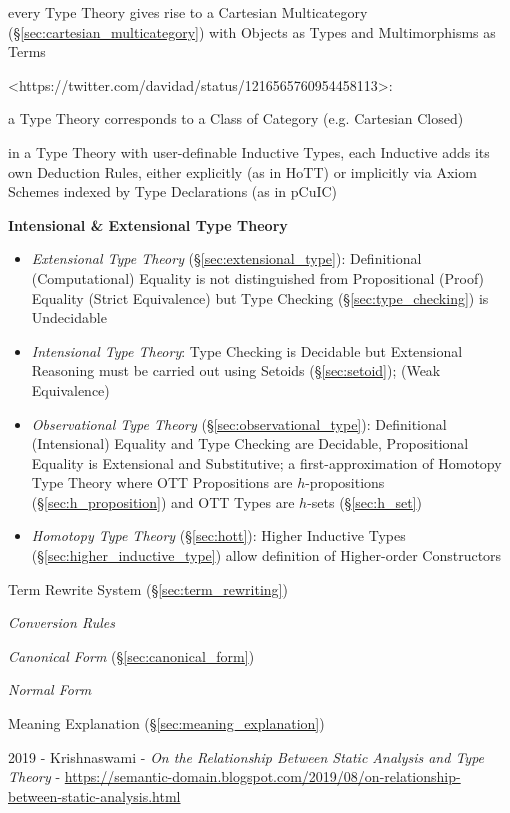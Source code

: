every Type Theory gives rise to a Cartesian Multicategory
(\S\ref{sec:cartesian_multicategory}) with Objects as Types and Multimorphisms
as Terms

<https://twitter.com/davidad/status/1216565760954458113>:

a Type Theory corresponds to a Class of Category (e.g. Cartesian Closed)

in a Type Theory with user-definable Inductive Types, each Inductive adds its
own Deduction Rules, either explicitly (as in HoTT) or implicitly via Axiom
Schemes indexed by Type Declarations (as in pCuIC)


\textbf{Intensional \& Extensional Type Theory}

\begin{itemize}
\item \emph{Extensional Type Theory} (\S\ref{sec:extensional_type}):
  Definitional (Computational) Equality is not distinguished from
  Propositional (Proof) Equality (Strict Equivalence) but Type Checking
  (\S\ref{sec:type_checking}) is Undecidable

\item \emph{Intensional Type Theory}: Type Checking is Decidable but
  Extensional Reasoning must be carried out using Setoids
  (\S\ref{sec:setoid}); (Weak Equivalence)

\item \emph{Observational Type Theory}
  (\S\ref{sec:observational_type}): Definitional (Intensional)
  Equality and Type Checking are Decidable, Propositional Equality is
  Extensional and Substitutive; a first-approximation of Homotopy Type
  Theory where OTT Propositions are $h$-propositions
  (\S\ref{sec:h_proposition}) and OTT Types are $h$-sets
  (\S\ref{sec:h_set})

\item \emph{Homotopy Type Theory} (\S\ref{sec:hott}):
  Higher Inductive Types (\S\ref{sec:higher_inductive_type}) allow
  definition of Higher-order Constructors
\end{itemize}

Term Rewrite System (\S\ref{sec:term_rewriting})

\emph{Conversion Rules}

\emph{Canonical Form} (\S\ref{sec:canonical_form})

\emph{Normal Form}


Meaning Explanation (\S\ref{sec:meaning_explanation})

2019 - Krishnaswami -
\emph{On the Relationship Between Static Analysis and Type Theory}
-
\url{https://semantic-domain.blogspot.com/2019/08/on-relationship-between-static-analysis.html}


